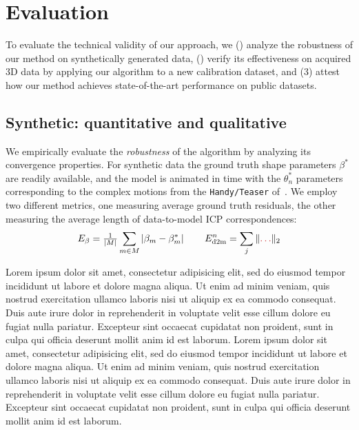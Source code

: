
\section{Evaluation}
To evaluate the technical validity of our approach, we () analyze the robustness of our method on synthetically generated data, () verify its effectiveness on acquired 3D data by applying our algorithm to a new calibration dataset, and (3) attest how our method achieves state-of-the-art performance on public datasets.

\subsection{Synthetic: quantitative and qualitative}
\label{sec:evalsynth}
We empirically evaluate the \emph{robustness} of the algorithm by analyzing its convergence properties. 
For synthetic data the ground truth shape parameters $\beta^*$ are readily available, and the model is animated in time with the $\theta^*_n$ parameters corresponding to the complex motions from the \texttt{Handy/Teaser} of~\cite{tkach2016sphere}. 
We employ two different metrics, one measuring average ground truth residuals, the other measuring the average length of data-to-model ICP correspondences:
% 
\begin{equation*}
E_{\beta} = \tfrac{1}{|M|} \sum_{m \in M} \left| \beta_m - \beta_m^* \right| 
\quad \quad
E_\text{d2m}^n = \sum_j \| \todo{\dots}  \|_2
\label{eq:metrics}
\end{equation*}


\begin{DRAFT}
Lorem ipsum dolor sit amet, consectetur adipisicing elit, sed do eiusmod tempor incididunt ut labore et dolore magna aliqua. Ut enim ad minim veniam, quis nostrud exercitation ullamco laboris nisi ut aliquip ex ea commodo consequat. Duis aute irure dolor in reprehenderit in voluptate velit esse cillum dolore eu fugiat nulla pariatur. Excepteur sint occaecat cupidatat non proident, sunt in culpa qui officia deserunt mollit anim id est laborum. Lorem ipsum dolor sit amet, consectetur adipisicing elit, sed do eiusmod tempor incididunt ut labore et dolore magna aliqua. Ut enim ad minim veniam, quis nostrud exercitation ullamco laboris nisi ut aliquip ex ea commodo consequat. Duis aute irure dolor in reprehenderit in voluptate velit esse cillum dolore eu fugiat nulla pariatur. Excepteur sint occaecat cupidatat non proident, sunt in culpa qui officia deserunt mollit anim id est laborum.
\end{DRAFT}

